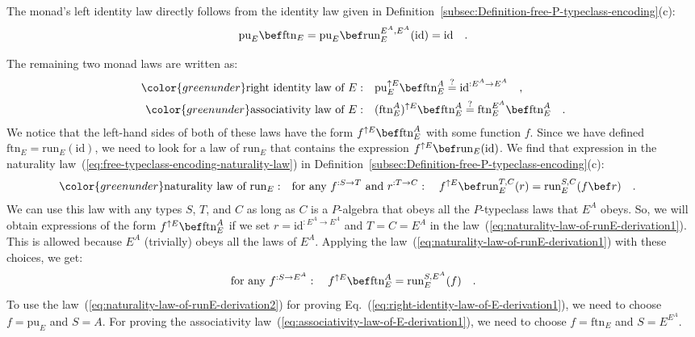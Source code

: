The monad\textsf{'}s left identity law directly follows from the identity law
given in Definition~\ref{subsec:Definition-free-P-typeclass-encoding}(c):
\[
\text{pu}_{E}\bef\text{ftn}_{E}=\text{pu}_{E}\bef\text{run}_{E}^{E^{A},E^{A}}(\text{id})=\text{id}\quad.
\]

The remaining two monad laws are written as:
\begin{align}
{\color{greenunder}\text{right identity law of }E:}\quad & \text{pu}_{E}^{\uparrow E}\bef\text{ftn}_{E}^{A}\overset{?}{=}\text{id}^{:E^{A}\rightarrow E^{A}}\quad,\label{eq:right-identity-law-of-E-derivation1}\\
{\color{greenunder}\text{associativity law of }E:}\quad & (\text{ftn}_{E}^{A})^{\uparrow E}\bef\text{ftn}_{E}^{A}\overset{?}{=}\text{ftn}_{E}^{E^{A}}\bef\text{ftn}_{E}^{A}\quad.\label{eq:associativity-law-of-E-derivation1}
\end{align}
 We notice that the left-hand sides of both of these laws have the
form $f^{\uparrow E}\bef\text{ftn}_{E}^{A}$ with some function $f$.
Since we have defined $\text{ftn}_{E}=\text{run}_{E}(\text{id})$,
we need to look for a law of $\text{run}_{E}$ that contains the expression
$f^{\uparrow E}\bef\text{run}_{E}(\text{id})$. We find that expression
in the naturality law~(\ref{eq:free-typeclass-encoding-naturality-law})
in Definition~\ref{subsec:Definition-free-P-typeclass-encoding}(c):
\begin{align}
{\color{greenunder}\text{naturality law of }\text{run}_{E}:}\quad & \text{for any }f^{:S\rightarrow T}\text{ and }r^{:T\rightarrow C}:\quad f^{\uparrow E}\bef\text{run}_{E}^{T,C}(r)=\text{run}_{E}^{S,C}(f\bef r)\quad.\label{eq:naturality-law-of-runE-derivation1}
\end{align}
We can use this law with any types $S$, $T$, and $C$ as long as
$C$ is a $P$-algebra that obeys all the $P$-typeclass laws that
$E^{A}$ obeys. So, we will obtain expressions of the form $f^{\uparrow E}\bef\text{ftn}_{E}^{A}$
if we set $r=\text{id}^{:E^{A}\rightarrow E^{A}}$ and $T=C=E^{A}$
in the law~(\ref{eq:naturality-law-of-runE-derivation1}). This is
allowed because $E^{A}$ (trivially) obeys all the laws of $E^{A}$.
Applying the law~(\ref{eq:naturality-law-of-runE-derivation1}) with
these choices, we get:
\begin{equation}
\text{for any }f^{:S\rightarrow E^{A}}:\quad f^{\uparrow E}\bef\text{ftn}_{E}^{A}=\text{run}_{E}^{S,E^{A}}(f)\quad.\label{eq:naturality-law-of-runE-derivation2}
\end{equation}
To use the law~(\ref{eq:naturality-law-of-runE-derivation2}) for
proving Eq.~(\ref{eq:right-identity-law-of-E-derivation1}), we need
to choose $f=\text{pu}_{E}$ and $S=A$. For proving the associativity
law~(\ref{eq:associativity-law-of-E-derivation1}), we need to choose
$f=\text{ftn}_{E}$ and $S=E^{E^{A}}$. 

